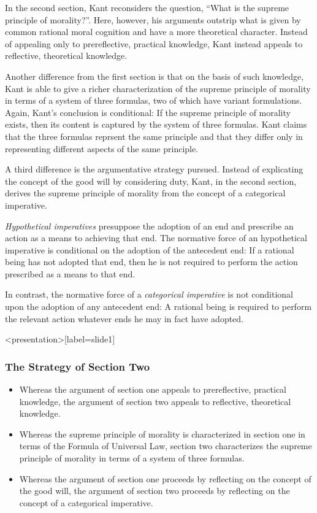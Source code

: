 In the second section, Kant reconsiders the question, ``What is the su\-preme principle of morality?''. Here, however, his arguments outstrip what is given by common rational moral cognition and have a more theoretical character. Instead of appealing only to prereflective, practical knowledge, Kant instead appeals to reflective, theoretical knowledge. \change

Another difference from the first section is that on the basis of such knowledge, Kant is able to give a richer characterization of the supreme principle of morality in terms of a system of three formulas, two of which have variant formulations. Again, Kant's conclusion is conditional: If the supreme principle of morality exists, then its content is captured by the system of three formulas. Kant claims that the three formulas reprsent the same principle and that they differ only in representing different aspects of the same principle. \change

A third difference is the argumentative strategy pursued. Instead of explicating the concept of the good will by considering duty, Kant, in the second section, derives the supreme principle of morality from the concept of a categorical imperative.

\emph{Hypothetical imperatives} presuppose the adoption of an end and prescribe an action as a means to achieving that end. The normative force of an hypothetical imperative is conditional on the adoption of the antecedent end: If a rational being has not adopted that end, then he is not required to perform the action prescribed as a means to that end.

In contrast, the normative force of a \emph{categorical imperative} is not conditional upon the adoption of any antecedent end: A rational being is required to perform the relevant action whatever ends he may in fact have adopted. \change

\begin{frame}<presentation>[label=slide1]
    \frametitle{The Strategy of Section Two}
        \begin{itemize}
            \item<1-> Whereas the argument of section one appeals to \alert{prereflective}, \alert{practical} knowledge, the argument of section two appeals to \alert{reflective}, \alert{theoretical} knowledge.
            \item<2-> Whereas the supreme principle of morality is characterized in section one in terms of the \alert{Formula of Universal Law}, section two characterizes the supreme principle of morality in terms of \alert{a system of three formulas}.
            \item<3-> Whereas the argument of section one proceeds by reflecting on the concept of the \alert{good will}, the argument of section two proceeds by reflecting on the concept of a \alert{categorical imperative}.
        \end{itemize}
\end{frame}

